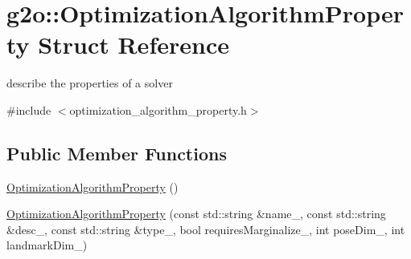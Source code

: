 \hypertarget{structg2o_1_1OptimizationAlgorithmProperty}{}\section{g2o\+:\+:Optimization\+Algorithm\+Property Struct Reference}
\label{structg2o_1_1OptimizationAlgorithmProperty}


describe the properties of a solver  




{\ttfamily \#include $<$optimization\+\_\+algorithm\+\_\+property.\+h$>$}

\subsection*{Public Member Functions}
\begin{DoxyCompactItemize}
\item 
\hyperlink{structg2o_1_1OptimizationAlgorithmProperty_a2d83548ee175988e11738ae43c7a9803}{Optimization\+Algorithm\+Property} ()
\item 
\hyperlink{structg2o_1_1OptimizationAlgorithmProperty_a5633cbd029eda42670f801de508f945b}{Optimization\+Algorithm\+Property} (const std\+::string \&name\+\_\+, const std\+::string \&desc\+\_\+, const std\+::string \&type\+\_\+, bool requires\+Marginalize\+\_\+, int pose\+Dim\+\_\+, int landmark\+Dim\+\_\+)
\end{DoxyCompactItemize}
